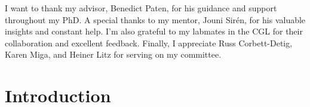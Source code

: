 \documentclass[11pt]{ucthesis}
\begin{document}
\begin{frontmatter}
\begin{acknowledgements}
I want to thank my advisor, Benedict Paten, for his guidance and support throughout my PhD. A special thanks to my mentor, Jouni Sirén, for his valuable insights and constant help. I'm also grateful to my labmates in the CGL for their collaboration and excellent feedback. Finally, I appreciate Russ Corbett-Detig, Karen Miga, and Heiner Litz for serving on my committee.
\end{acknowledgements}

\end{frontmatter}


\chapter*{Introduction}
\end{document}

